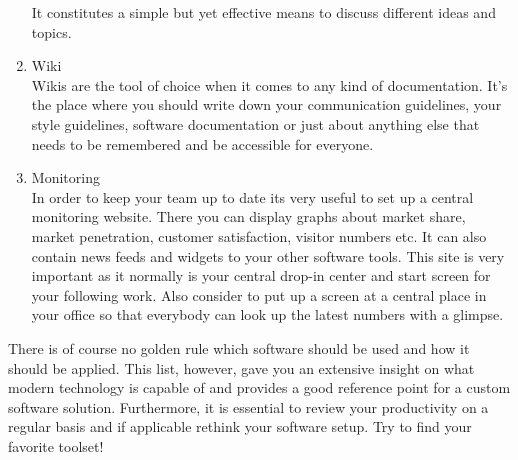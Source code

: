\begin{multicols}{2}
\begin{enumerate}[1.]
It constitutes a simple but yet effective means to discuss different ideas and topics.
	\item Wiki\\
Wikis are the tool of choice when it comes to any kind of documentation. It’s the place where you should write down your communication guidelines, your style guidelines, software documentation or just about anything else that needs to be remembered and be accessible for everyone.
	\item Monitoring\\
In order to keep your team up to date its very useful to set up a central monitoring website. There you can display graphs about market share, market penetration, customer satisfaction, visitor numbers etc. It can also contain news feeds and widgets to your other software tools. This site is very important as it normally is your central drop-in center and start screen for your following work. Also consider to put up a screen at a central place in your office so that everybody can look up the latest numbers with a glimpse.
\end{enumerate}

There is of course no golden rule which software should be used and how it should be applied. This list, however, gave you an extensive insight on what modern technology is capable of and provides a good reference point for a custom software solution. Furthermore, it is essential to review your productivity on a regular basis and if applicable rethink your software setup. Try to find your favorite toolset!
\end{multicols}